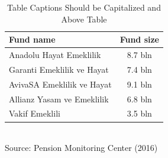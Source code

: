 \begin{table}
	\centering
	\caption{Table Captions Should be Capitalized and Above Table}
	\begin{tabular}[H]{lc}
		\hline
		Fund name&Fund size\\
		\hline
		Anadolu Hayat Emeklilik&8.7 bln\\
		Garanti Emeklilik ve Hayat&7.4 bln\\
		AvivaSA Emeklilik ve Hayat&9.1 bln\\
		Allianz Yasam ve Emeklilik&6.8 bln\\
		Vakif Emeklili&3.5 bln\\
		\hline
	\end{tabular}\\
	Source: Pension Monitoring Center (2016)
\end{table}
